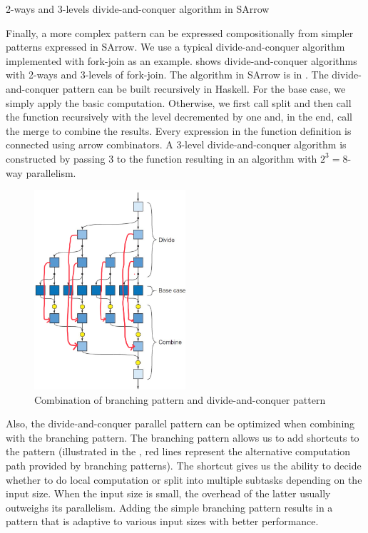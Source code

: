 \begin{listing}[ht]
    \inputminted{Haskell}{arrow/dq.hs}
    \caption{2-ways and 3-levels divide-and-conquer algorithm in SArrow}
    \label{SArrow:dq}
\end{listing}

Finally, a more complex pattern can be expressed compositionally from simpler patterns expressed in SArrow. We use a typical divide-and-conquer algorithm implemented with fork-join as an example.  shows divide-and-conquer algorithms with 2-ways and 3-levels of fork-join. The algorithm in SArrow is in . The divide-and-conquer pattern can be built recursively in Haskell. For the base case, we simply apply the basic computation. Otherwise, we first call split and then call the function recursively with the level decremented by one and, in the end, call the merge to combine the results. Every expression in the function definition is connected using arrow combinators. A 3-level divide-and-conquer algorithm is constructed by passing 3 to the function resulting in an algorithm with $2^3 = 8$-way parallelism.

\begin{figure}[ht]
    \centering
    \includegraphics[width=0.5\textwidth]{arrow/dq2.jpeg}
    \caption{Combination of branching pattern and divide-and-conquer pattern}
    \label{SArrow:fig:brdv}
\end{figure}
Also, the divide-and-conquer parallel pattern can be optimized when combining with the branching pattern. The branching pattern allows us to add shortcuts to the pattern (illustrated in the , red lines represent the alternative computation path provided by branching patterns). The shortcut gives us the ability to decide whether to do local computation or split into multiple subtasks depending on the input size. When the input size is small, the overhead of the latter usually outweighs its parallelism. Adding the simple branching pattern results in a pattern that is adaptive to various input sizes with better performance.

